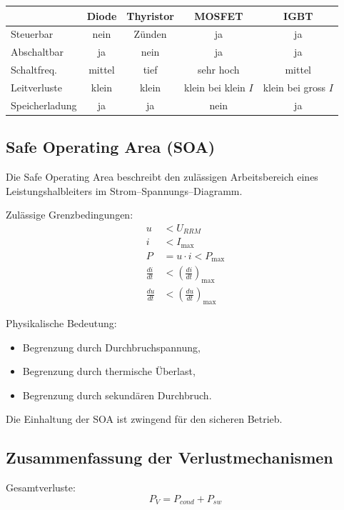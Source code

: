 \begin{center}
\begin{tabular}{l|c|c|c|c}
 & Diode & Thyristor & MOSFET & IGBT \\
\hline
Steuerbar & nein & Zünden & ja & ja \\
Abschaltbar & ja & nein & ja & ja \\
Schaltfreq. & mittel & tief & sehr hoch & mittel \\
Leitverluste & klein & klein & klein bei klein $I$ & klein bei gross $I$ \\
Speicherladung & ja & ja & nein & ja \\
\end{tabular}
\end{center}

\subsection{Safe Operating Area (SOA)}

Die Safe Operating Area beschreibt den zulässigen Arbeitsbereich eines Leistungshalbleiters
im Strom--Spannungs--Diagramm.

Zulässige Grenzbedingungen:
\[
\boxed{
\begin{aligned}
u &< U_{RRM} \\
i &< I_{\max} \\
P &= u \cdot i < P_{\max} \\
\frac{di}{dt} &< \left(\frac{di}{dt}\right)_{\max} \\
\frac{du}{dt} &< \left(\frac{du}{dt}\right)_{\max}
\end{aligned}
}
\]

Physikalische Bedeutung:
\begin{itemize}
\item Begrenzung durch Durchbruchspannung,
\item Begrenzung durch thermische Überlast,
\item Begrenzung durch sekundären Durchbruch.
\end{itemize}

Die Einhaltung der SOA ist zwingend für den sicheren Betrieb.

\subsection{Zusammenfassung der Verlustmechanismen}

Gesamtverluste:
\[
\boxed{P_V = P_{cond} + P_{sw}}
\]

